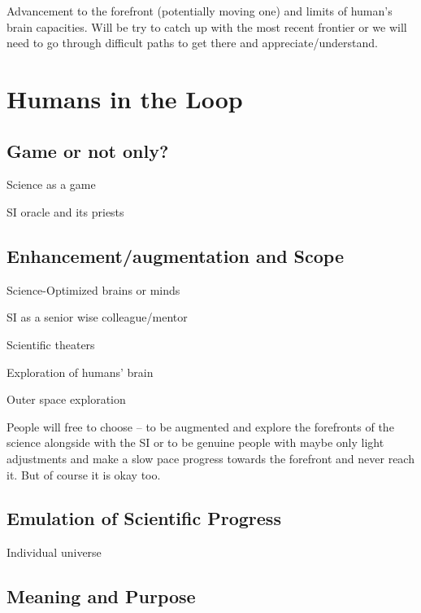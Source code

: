 \documentclass[a4paper,11pt]{article}
\begin{document}
        Advancement to the forefront (potentially moving one) and limits of human's brain capacities. Will be try to catch up with the most recent frontier or we will need to go through difficult paths to get there and appreciate/understand.

    \section{Humans in the Loop}

        \subsection{Game or not only?}

        Science as a game

        SI oracle and its priests

        \subsection{Enhancement/augmentation and Scope}

        Science-Optimized brains or minds

        SI as a senior wise colleague/mentor

        Scientific theaters

        Exploration of humans' brain

        Outer space exploration

        People will free to choose -- to be augmented and explore the forefronts of the science alongside with the SI or to be genuine people with maybe only light adjustments and make a slow pace progress towards the forefront and never reach it. But of course it is okay too.

        \subsection{Emulation of Scientific Progress}

        Individual universe

        \subsection{Meaning and Purpose}






\printbibliography
\end{document}
